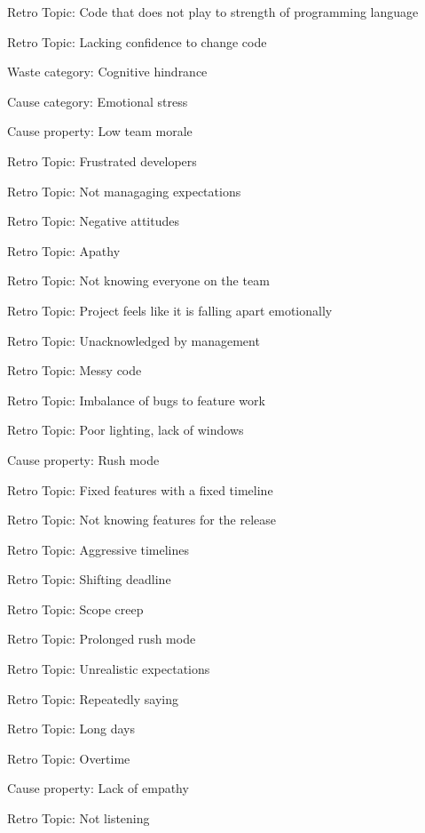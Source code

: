 \quad \quad \quad Retro Topic: Code that does not play to strength of programming language

\quad \quad \quad Retro Topic: Lacking confidence to change code

Waste category: Cognitive hindrance

\quad Cause category: Emotional stress

\quad \quad Cause property: Low team morale

\quad \quad \quad Retro Topic: Frustrated developers

\quad \quad \quad Retro Topic: Not managaging expectations

\quad \quad \quad Retro Topic: Negative attitudes

\quad \quad \quad Retro Topic: Apathy

\quad \quad \quad Retro Topic: Not knowing everyone on the team

\quad \quad \quad Retro Topic: Project feels like it is falling apart emotionally

\quad \quad \quad Retro Topic: Unacknowledged by management

\quad \quad \quad Retro Topic: Messy code

\quad \quad \quad Retro Topic: Imbalance of bugs to feature work

\quad \quad \quad Retro Topic: Poor lighting, lack of windows

\quad \quad Cause property: Rush mode

\quad \quad \quad Retro Topic: Fixed features with a fixed timeline

\quad \quad \quad Retro Topic: Not knowing features for the release

\quad \quad \quad Retro Topic: Aggressive timelines

\quad \quad \quad Retro Topic: Shifting deadline

\quad \quad \quad Retro Topic: Scope creep

\quad \quad \quad Retro Topic: Prolonged rush mode

\quad \quad \quad Retro Topic: Unrealistic expectations

\quad \quad \quad Retro Topic: Repeatedly saying 

\quad \quad \quad Retro Topic: Long days

\quad \quad \quad Retro Topic: Overtime

\quad \quad Cause property: Lack of empathy

\quad \quad \quad Retro Topic: Not listening

